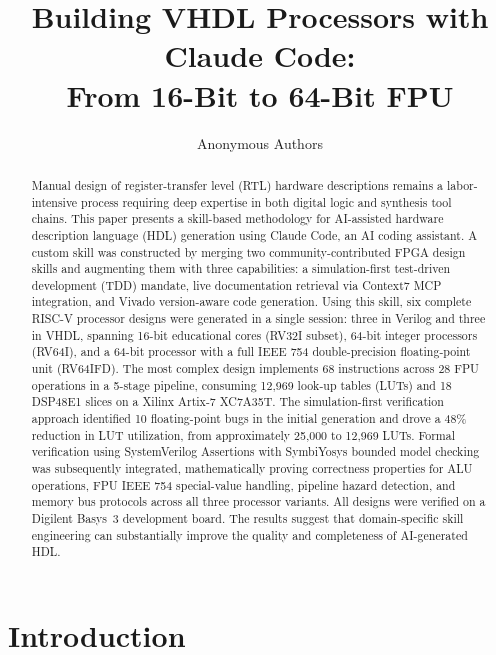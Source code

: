 \documentclass[conference]{IEEEtran}
\begin{document}
\title{Building VHDL Processors with Claude Code:\\From 16-Bit to 64-Bit FPU}

\author{Anonymous Authors}

\maketitle

\begin{abstract}
Manual design of register-transfer level (RTL) hardware descriptions remains a labor-intensive process requiring deep expertise in both digital logic and synthesis tool chains. This paper presents a skill-based methodology for AI-assisted hardware description language (HDL) generation using Claude Code, an AI coding assistant. A custom skill was constructed by merging two community-contributed FPGA design skills and augmenting them with three capabilities: a simulation-first test-driven development (TDD) mandate, live documentation retrieval via Context7 MCP integration, and Vivado version-aware code generation. Using this skill, six complete RISC-V processor designs were generated in a single session: three in Verilog and three in VHDL, spanning 16-bit educational cores (RV32I subset), 64-bit integer processors (RV64I), and a 64-bit processor with a full IEEE 754 double-precision floating-point unit (RV64IFD). The most complex design implements 68 instructions across 28 FPU operations in a 5-stage pipeline, consuming 12,969 look-up tables (LUTs) and 18 DSP48E1 slices on a Xilinx Artix-7 XC7A35T. The simulation-first verification approach identified 10 floating-point bugs in the initial generation and drove a 48\% reduction in LUT utilization, from approximately 25,000 to 12,969 LUTs. Formal verification using SystemVerilog Assertions with SymbiYosys bounded model checking was subsequently integrated, mathematically proving correctness properties for ALU operations, FPU IEEE 754 special-value handling, pipeline hazard detection, and memory bus protocols across all three processor variants. All designs were verified on a Digilent Basys~3 development board. The results suggest that domain-specific skill engineering can substantially improve the quality and completeness of AI-generated HDL.
\end{abstract}

\section{Introduction}
\end{document}
